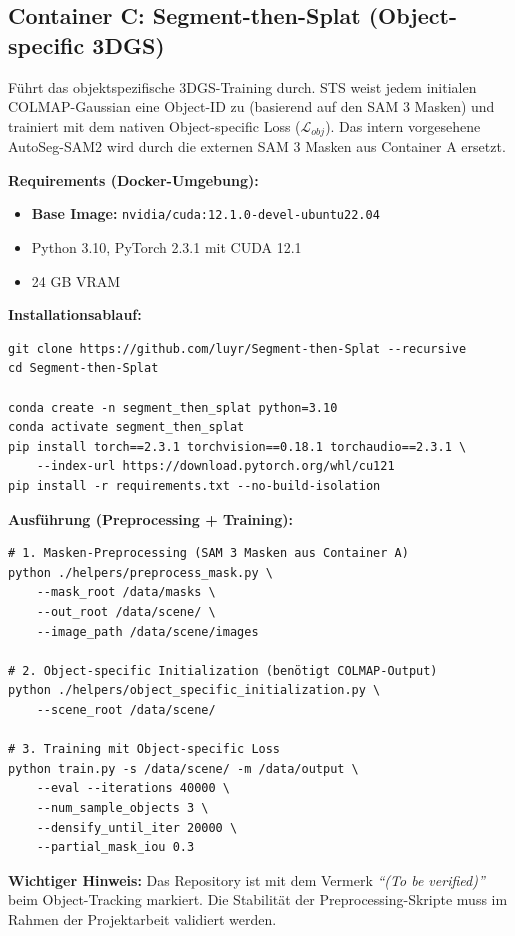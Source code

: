 \documentclass[12pt,a4paper]{article}
\begin{document}
\subsection*{Container C: Segment-then-Splat (Object-specific 3DGS)}
Führt das objektspezifische 3DGS-Training durch. STS weist jedem initialen COLMAP-Gaussian eine Object-ID zu (basierend auf den SAM 3 Masken) und trainiert mit dem nativen Object-specific Loss ($\mathcal{L}_{obj}$). Das intern vorgesehene AutoSeg-SAM2 wird durch die externen SAM 3 Masken aus Container A ersetzt.

\textbf{Requirements (Docker-Umgebung):}
\begin{itemize}[noitemsep]
    \item \textbf{Base Image:} \texttt{nvidia/cuda:12.1.0-devel-ubuntu22.04}
    \item Python 3.10, PyTorch 2.3.1 mit CUDA 12.1
    \item 24 GB VRAM
\end{itemize}

\textbf{Installationsablauf:}
\begin{verbatim}
git clone https://github.com/luyr/Segment-then-Splat --recursive
cd Segment-then-Splat

conda create -n segment_then_splat python=3.10
conda activate segment_then_splat
pip install torch==2.3.1 torchvision==0.18.1 torchaudio==2.3.1 \
    --index-url https://download.pytorch.org/whl/cu121
pip install -r requirements.txt --no-build-isolation
\end{verbatim}

\textbf{Ausführung (Preprocessing + Training):}
\begin{verbatim}
# 1. Masken-Preprocessing (SAM 3 Masken aus Container A)
python ./helpers/preprocess_mask.py \
    --mask_root /data/masks \
    --out_root /data/scene/ \
    --image_path /data/scene/images

# 2. Object-specific Initialization (benötigt COLMAP-Output)
python ./helpers/object_specific_initialization.py \
    --scene_root /data/scene/

# 3. Training mit Object-specific Loss
python train.py -s /data/scene/ -m /data/output \
    --eval --iterations 40000 \
    --num_sample_objects 3 \
    --densify_until_iter 20000 \
    --partial_mask_iou 0.3
\end{verbatim}

\textbf{Wichtiger Hinweis:} Das Repository ist mit dem Vermerk \textit{``(To be verified)''} beim Object-Tracking markiert. Die Stabilität der Preprocessing-Skripte muss im Rahmen der Projektarbeit validiert werden.
\end{document}
